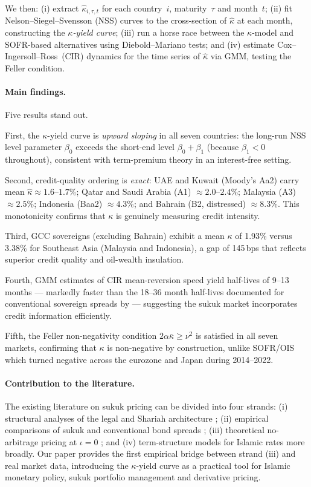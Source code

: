 \documentclass[12pt]{article}
\theoremstyle{plain}
\theoremstyle{definition}
\theoremstyle{remark}
\begin{document}
We then: (i) extract $\hat{\kappa}_{i,\tau,t}$ for each country~$i$,
maturity~$\tau$ and month~$t$; (ii) fit Nelson--Siegel--Svensson
(NSS) \citep{NelsonSiegel1987,Svensson1994} curves to the cross-section of
$\hat{\kappa}$ at each month, constructing the \emph{$\kappa$-yield curve};
(iii) run a horse race between the $\kappa$-model and SOFR-based alternatives
using Diebold--Mariano \citep{DieboldMariano1995} tests; and (iv) estimate
Cox--Ingersoll--Ross~(CIR) \citep{CIR1985} dynamics for the time series of
$\hat{\kappa}$ via GMM, testing the Feller condition.

\paragraph{Main findings.}
Five results stand out.

First, the $\kappa$-yield curve is \emph{upward sloping} in all seven
countries: the long-run NSS level parameter $\beta_0$ exceeds the short-end
level $\beta_0 + \beta_1$ (because $\beta_1 < 0$ throughout), consistent
with term-premium theory in an interest-free setting.

Second, credit-quality ordering is \emph{exact}: UAE and Kuwait (Moody's Aa2)
carry mean $\hat{\kappa} \approx 1.6$--$1.7\%$; Qatar and Saudi Arabia (A1)
$\approx 2.0$--$2.4\%$; Malaysia (A3) $\approx 2.5\%$; Indonesia (Baa2)
$\approx 4.3\%$; and Bahrain (B2, distressed) $\approx 8.3\%$. This
monotonicity confirms that $\kappa$ is genuinely measuring credit intensity.

Third, GCC sovereigns (excluding Bahrain) exhibit a mean $\kappa$ of 1.93\%
versus 3.38\% for Southeast Asia (Malaysia and Indonesia), a gap of 145\,bps
that reflects superior credit quality and oil-wealth insulation.

Fourth, GMM estimates of CIR mean-reversion speed yield half-lives of 9--13
months --- markedly faster than the 18--36 month half-lives documented for
conventional sovereign spreads by \citet{DuffieSingleton1999} --- suggesting
the sukuk market incorporates credit information efficiently.

Fifth, the Feller non-negativity condition $2\alpha\bar{\kappa} \geq \nu^2$
is satisfied in all seven markets, confirming that $\kappa$ is non-negative by
construction, unlike SOFR/OIS which turned negative across the eurozone and
Japan during 2014--2022.

\paragraph{Contribution to the literature.}
The existing literature on sukuk pricing can be divided into four strands: (i)
structural analyses of the legal and Shariah architecture
\citep{Jobst2007}; (ii) empirical comparisons of sukuk and conventional bond
spreads \citep{CakırRaei2007}; (iii) theoretical no-arbitrage pricing at
$\iota = 0$ \citep{Ackerer2024,AhmedBhuyanIslam2026}; and (iv) term-structure
models for Islamic rates more broadly. Our paper provides the first empirical
bridge between strand (iii) and real market data, introducing the $\kappa$-yield
curve as a practical tool for Islamic monetary policy, sukuk portfolio
management and derivative pricing.
\end{document}
